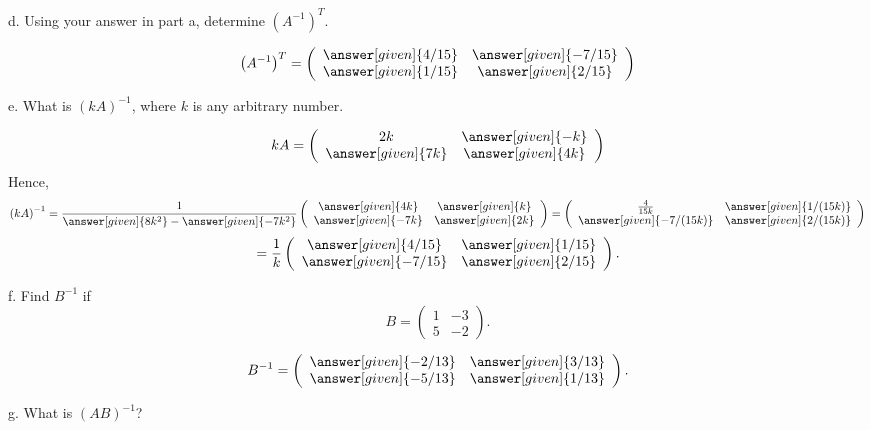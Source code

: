 \documentclass{ximera}
\begin{document}
\begin{example}
d. Using your answer in part a, determine $\left(A^{-1}\right)^{T}$.
\begin{prompt}
\[\left(A^{-1}\right)^{T}= \left(\begin{array}{cc}
  \answer[given]{4/15} &  \answer[given]{-7/15}  \\
   \answer[given]{1/15}&  \answer[given]{2/15}
\end{array}\right) \]
\end{prompt}

e. What is $(kA)^{-1}$, where $k$ is any arbitrary number.
\begin{prompt}
\[kA = \left(\begin{array}{cc}
  2k &  \answer[given]{-k}  \\
   \answer[given]{7k}&  \answer[given]{4k}
\end{array}\right) \]
Hence,
\[\left(kA\right)^{-1}= \frac{1}{\answer[given]{8k^{2}}- \answer[given]{-7k^2}} \left(\begin{array}{cc}
  \answer[given]{4k} &  \answer[given]{k}  \\
   \answer[given]{-7k}&  \answer[given]{2k}
\end{array}\right) = \left(\begin{array}{cc}
  \frac{4}{15k} &  \answer[given]{1/(15k)}  \\
   \answer[given]{-7/(15k)}&  \answer[given]{2/(15k)}
\end{array}\right)\]
\[ = \frac{1}{k}\left(\begin{array}{cc}
  \answer[given]{4/15} &  \answer[given]{1/15}  \\
   \answer[given]{-7/15}&  \answer[given]{2/15}
\end{array}\right). \]
\end{prompt}

f. Find $B^{-1}$ if
\[B= \left(\begin{array}{cc}
  1 &  -3  \\
   5&  -2
\end{array}\right).
\]


\begin{prompt}
\[B^{-1}= \left(\begin{array}{cc}
  \answer[given]{-2/13} &  \answer[given]{3/13}  \\
   \answer[given]{-5/13}&  \answer[given]{1/13}
\end{array}\right). \]
\end{prompt}

g. What is $(AB)^{-1}$?


\end{example}
\end{document}
